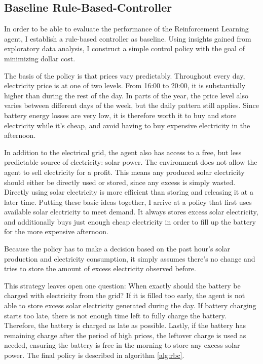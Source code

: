 \subsection{Baseline Rule-Based-Controller}
In order to be able to evaluate the performance of the Reinforcement Learning agent, I establish a rule-based controller as baseline.
Using insights gained from exploratory data analysis, I construct a simple control policy with the goal of minimizing dollar cost.

The basis of the policy is that prices vary predictably.
Throughout every day, electricity price is at one of two levels.
From 16:00 to 20:00, it is substantially higher than during the rest of the day.
In parts of the year, the price level also varies between different days of the week, but the daily pattern still applies.
Since battery energy losses are very low, it is therefore worth it to buy and store electricity while it's cheap, and avoid having to buy expensive electricity in the afternoon.

In addition to the electrical grid, the agent also has access to a free, but less predictable source of electricity: solar power.
The environment does not allow the agent to sell electricity for a profit.
This means any produced solar electricity should either be directly used or stored, since any excess is simply wasted. Directly using solar electricity is more efficient than storing and releasing it at a later time.
Putting these basic ideas together, I arrive at a policy that first uses available solar electricity to meet demand.
It always stores excess solar electricity, and additionally buys just enough cheap electricity in order to fill up the battery for the more expensive afternoon.

Because the policy has to make a decision based on the past hour's solar production and electricity consumption, it simply assumes there's no change and tries to store the amount of excess electricity observed before.

This strategy leaves open one question:
When exactly should the battery be charged with electricity from the grid?
If it is filled too early, the agent is not able to store excess solar electricity generated during the day.
If battery charging starts too late, there is not enough time left to fully charge the battery. Therefore, the battery is charged as late as possible.
Lastly, if the battery has remaining charge after the period of high prices, the leftover charge is used as needed, ensuring the battery is free in the morning to store any excess solar power.
The final policy is described in algorithm \ref{alg:rbc}.

